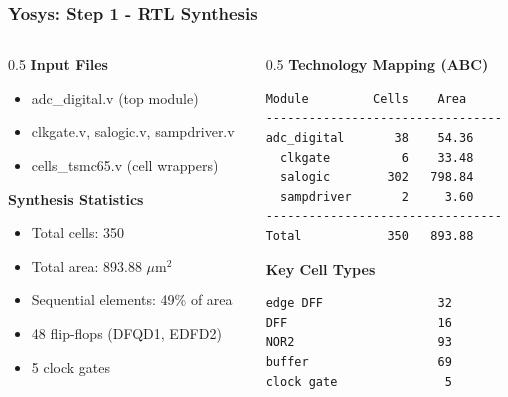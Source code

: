 \begin{frame}[fragile]
  \frametitle{Yosys: Step 1 - RTL Synthesis}
  \begin{columns}
    \begin{column}{0.5\textwidth}
      \textbf{Input Files}
      \begin{itemize}
        \item adc\_digital.v (top module)
        \item clkgate.v, salogic.v, sampdriver.v
        \item cells\_tsmc65.v (cell wrappers)
      \end{itemize}
      \vspace{1em}
      \textbf{Synthesis Statistics}
      \begin{itemize}
        \item Total cells: 350
        \item Total area: 893.88 $\mu$m$^2$
        \item Sequential elements: 49\% of area
        \item 48 flip-flops (DFQD1, EDFD2)
        \item 5 clock gates
      \end{itemize}
    \end{column}
    \begin{column}{0.5\textwidth}
      \textbf{Technology Mapping (ABC)}
      \begin{lstlisting}[basicstyle=\ttfamily\scriptsize]
Module         Cells    Area
---------------------------------
adc_digital       38    54.36
  clkgate          6    33.48
  salogic        302   798.84
  sampdriver       2     3.60
---------------------------------
Total            350   893.88
      \end{lstlisting}
      \vspace{0.5em}
      \textbf{Key Cell Types}
      \begin{lstlisting}[basicstyle=\ttfamily\scriptsize]
edge DFF                32
DFF                     16
NOR2                    93
buffer                  69
clock gate               5
      \end{lstlisting}
    \end{column}
  \end{columns}
\end{frame}

